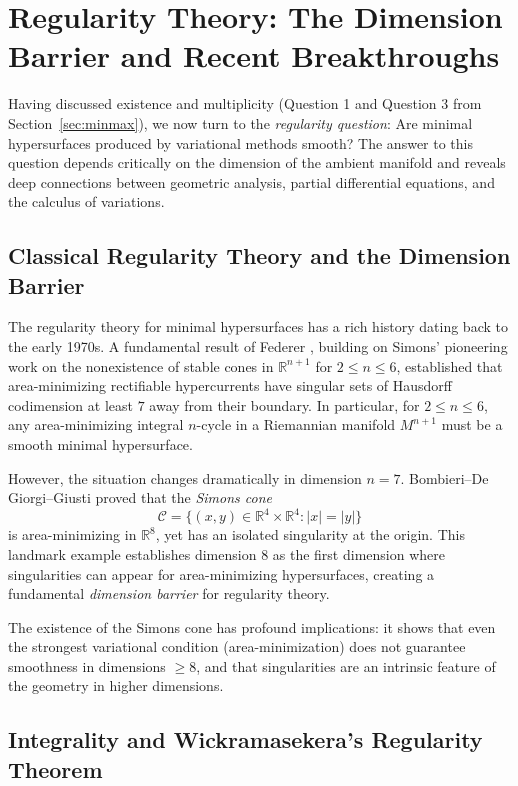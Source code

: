 \section{Regularity Theory: The Dimension Barrier and Recent Breakthroughs}\label{sec:regularity}

Having discussed existence and multiplicity (Question 1 and Question 3 from
Section~\ref{sec:minmax}), we now turn to the \emph{regularity question}: Are minimal hypersurfaces
produced by variational methods smooth? The answer to this question depends critically on the
dimension of the ambient manifold and reveals deep connections between geometric analysis, partial
differential equations, and the calculus of variations.

\subsection{Classical Regularity Theory and the Dimension Barrier}

The regularity theory for minimal hypersurfaces has a rich history dating back to the early 1970s.
A fundamental result of Federer \cite{Fed70}, building on Simons' pioneering work \cite{Sim68} on
the nonexistence of stable cones in $\mathbb{R}^{n+1}$ for $2 \leq n \leq 6$, established that
area-minimizing rectifiable hypercurrents have singular sets of Hausdorff codimension at least $7$
away from their boundary. In particular, for $2 \leq n \leq 6$, any area-minimizing integral
$n$-cycle in a Riemannian manifold $M^{n+1}$ must be a smooth minimal hypersurface.

However, the situation changes dramatically in dimension $n = 7$. Bombieri--De Giorgi--Giusti
\cite{BDGG69} proved that the \emph{Simons cone}
\[
    \mathcal{C} = \{(x,y) \in \mathbb{R}^4 \times \mathbb{R}^4 : |x| = |y|\}
\]
is area-minimizing in $\mathbb{R}^8$, yet has an isolated singularity at the origin. This landmark
example establishes dimension $8$ as the first dimension where singularities can appear for
area-minimizing hypersurfaces, creating a fundamental \emph{dimension barrier} for regularity theory.

The existence of the Simons cone has profound implications: it shows that even the strongest
variational condition (area-minimization) does not guarantee smoothness in dimensions $\geq 8$,
and that singularities are an intrinsic feature of the geometry in higher dimensions.

\subsection{Integrality and Wickramasekera's Regularity Theorem}\label{subsec:regularity-stable}

